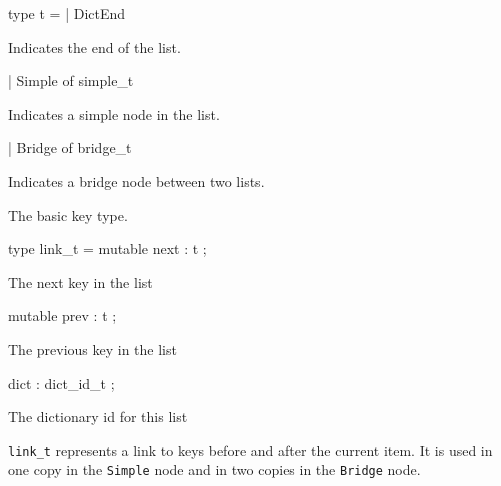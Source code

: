 \documentclass[11pt]{article}
\begin{document}
\label{type:Key.t}\begin{ocamldoccode}
type t =
  | DictEnd
\end{ocamldoccode}
\begin{ocamldoccomment}
Indicates the end of the list.
\end{ocamldoccomment}
\begin{ocamldoccode}
  | Simple of simple_t
\end{ocamldoccode}
\begin{ocamldoccomment}
Indicates a simple node in the
              list.
\end{ocamldoccomment}
\begin{ocamldoccode}
  | Bridge of bridge_t
\end{ocamldoccode}
\begin{ocamldoccomment}
Indicates a bridge node between two
              lists.
\end{ocamldoccomment}
\begin{ocamldocdescription}
The basic key type.


\end{ocamldocdescription}




\label{type:Key.link-underscoret}\begin{ocamldoccode}
type link_t = {}
  mutable next : t ;
\end{ocamldoccode}
\begin{ocamldoccomment}
The next key in the list
\end{ocamldoccomment}
\begin{ocamldoccode}
  mutable prev : t ;
\end{ocamldoccode}
\begin{ocamldoccomment}
The previous key in the list
\end{ocamldoccomment}
\begin{ocamldoccode}
  dict : dict_id_t ;
\end{ocamldoccode}
\begin{ocamldoccomment}
The dictionary id for this list
\end{ocamldoccomment}
\begin{ocamldoccode}
{}
\end{ocamldoccode}
\begin{ocamldocdescription}
{\tt{link\_t}} represents a link to keys before and after the current item.
    It is used in one copy in the {\tt{Simple}} node and in two copies in the
    {\tt{Bridge}} node.


\end{ocamldocdescription}
\end{document}
